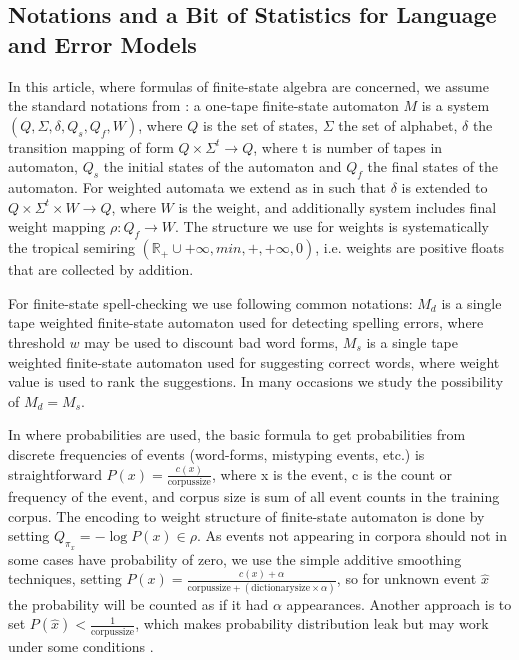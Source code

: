 \documentclass[a4paper,12pt]{article}
\begin{document}
\subsection{Notations and a Bit of Statistics for Language and Error Models}
\label{subsec:theory}

In this article, where formulas of finite-state algebra are concerned, we
assume the standard notations from \cite{aho2007compilers}: a one-tape
finite-state automaton $M$ is a system $(Q, \Sigma, \delta, Q_s, Q_f, W)$,
where $Q$ is the set of states, $\Sigma$ the set of alphabet, $\delta$ the
transition mapping of form $Q \times \Sigma^t \rightarrow Q$, where t is number
of tapes in automaton, $Q_s$ the initial states of the automaton and $Q_f$ the
final states of the automaton. For weighted automata we extend as in
\cite{mohri2009weighted} such that $\delta$ is extended to $Q \times \Sigma^t
\times W \rightarrow Q$, where $W$ is the weight, and additionally system
includes final weight mapping $\rho: Q_f \rightarrow W$. The structure we
use for weights is systematically the tropical semiring 
$(\mathbb{R}_+ \cup {+\infty}, min, +, +\infty, 0)$, i.e. weights are positive
floats that are collected by addition.

For finite-state spell-checking we use following common notations: $M_d$ is a
single tape weighted finite-state automaton used for detecting spelling errors,
where threshold $w$ may be used to discount bad word forms, $M_s$ is a single
tape weighted finite-state automaton used for suggesting correct words, where
weight value is used to rank the suggestions. In many occasions we study the
possibility of $M_d = M_s$. 

In where probabilities are used, the basic formula to get probabilities from
discrete frequencies of events (word-forms, mistyping events, etc.) is
straightforward $P(x) = \frac{c(x)}{\mathrm{corpus size}}$, where x is the
event, c is the count or frequency of the event, and corpus size is sum of all
event counts in the training corpus. The encoding to weight structure of
finite-state automaton is done by setting $Q_{\pi_x} = -\log P(x) \in \rho$.
As events not appearing in corpora should not in some cases have probability of
zero, we use the simple additive smoothing techniques, setting $P(x) =
\frac{c(x) + \alpha}{\mathrm{corpus size} + (\mathrm{dictionary size} \times
\alpha)}$, so for unknown event $\hat{x}$ the probability will be counted as if
it had $\alpha$ appearances.  Another approach is to set $P(\hat{x}) <
\frac{1}{\mathrm{corpus size}}$, which makes probability distribution leak but
may work under some conditions \cite[]{brants2007large}.
\end{document}
